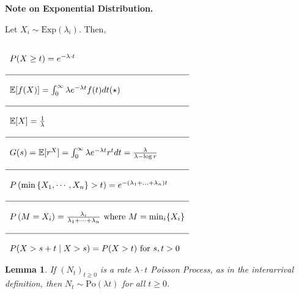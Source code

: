 \documentclass{tufte-handout}
\newtheorem{lem}[thm]{Lemma}
\begin{document}
\begin{marginfigure}
  
  \vphantom{.}

  \noindent \textbf{Note on Exponential Distribution.}

  \vphantom{.}

  \noindent Let $X_i \sim \text{Exp}(\lambda_i)$. Then,

  \noindent $\begin{array}{l}
     \\ P(X \geq t) = e^{-\lambda \cdot t} \\ \\ \hline  \\
     \mathbb{E}[f(X)]  = \int_{0}^{\infty} \lambda e^{-\lambda t} f(t) d t (\star) \\ \\ \hline  \\
     \mathbb{E}[X] = \frac{1}{\lambda} \\ \\ \hline  \\
     G(s) = \mathbb{E}[r^X] = \int_{0}^{\infty} \lambda e^{-\lambda t} r^t d t = \frac{\lambda}{\lambda - \log r}  \\ \\ \hline \\

     P\left(\min \left\{X_{1}, \cdots, X_{n}\right\}>t\right)=e^{-\left(\lambda_{1}+\ldots+\lambda_{n}\right) t}  \\ \\ \hline \\

     P\left(M=X_{i}\right)=\frac{\lambda_{i}}{\lambda_{1}+\cdots+\lambda_{n}} \text{ where } M = \min_i \{X_i\}  \\ \\ \hline \\

     P(X>s+t \mid X>s)=P(X>t) \text { for } s, t>0 \\
    \end{array}$
\end{marginfigure}

\begin{lem}
  If $(N_t)_{t \geq 0}$ is a rate $\lambda \cdot t$ Poisson Process, as in the interarrival definition, then $N_t \sim \text{Po}(\lambda t)$ for all $t \geq 0$.
\end{lem}
\end{document}
